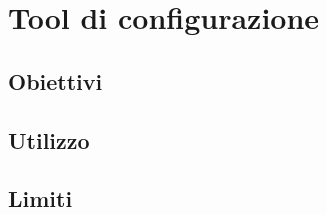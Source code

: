 \section{Tool di configurazione}
\subsection{Obiettivi}

\subsection{Utilizzo}

\subsection{Limiti}
